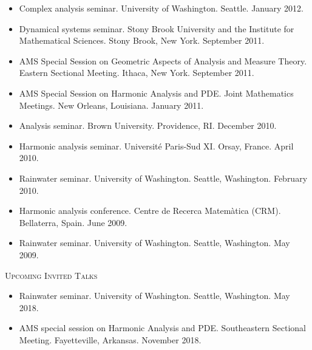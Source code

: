 \documentclass[12pt]{amsart}
\newcommand{\esection}{\vspace{.3cm}}
\begin{document}
\begin{itemize}
\item Complex analysis seminar. University of Washington. Seattle. January 2012.
\item Dynamical systems seminar. Stony Brook University and the Institute for Mathematical Sciences. Stony Brook, New York. September 2011.
\item AMS Special Session on Geometric Aspects of Analysis and Measure Theory. Eastern Sectional Meeting. Ithaca, New York. September 2011.
\item AMS Special Session on Harmonic Analysis and PDE. Joint Mathematics Meetings. New Orleans, Louisiana. January 2011.
\item Analysis seminar. Brown University. Providence, RI. December 2010.
\item Harmonic analysis seminar. Universit\'e Paris-Sud XI. Orsay, France. April 2010.
\item Rainwater seminar. University of Washington. Seattle, Washington. February 2010.
\item Harmonic analysis conference. Centre de Recerca Matem\`atica (CRM). Bellaterra, Spain. June 2009.
\item Rainwater seminar. University of Washington. Seattle, Washington. May 2009.
\end{itemize}

\textsc{Upcoming Invited Talks}
\begin{itemize}

\item Rainwater seminar. University of Washington. Seattle, Washington. May 2018.
\item AMS special session on Harmonic Analysis and PDE. Southeastern Sectional Meeting. Fayetteville, Arkansas. November 2018.

\end{itemize}


\esection
\end{document}

